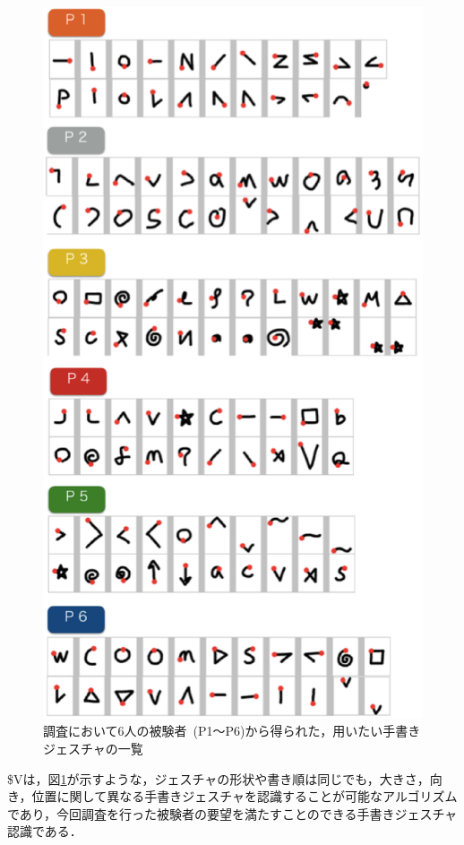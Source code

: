 \begin{figure} [t]
 \begin{center}
  \includegraphics [width=0.7\columnwidth]{img/elicetated_strokes.eps}
  \caption{調査において6人の被験者~(P1〜P6)から得られた，用いたい手書きジェスチャの一覧}
  \label{fig:elicetated_strokes}
 \end{center}
\end{figure}

\$Vは，図\ref{fig:elicetated_strokes}が示すような，ジェスチャの形状や書き順は同じでも，大きさ，向き，位置に関して異なる手書きジェスチャを認識することが可能なアルゴリズムであり，今回調査を行った被験者の要望を満たすことのできる手書きジェスチャ認識である．






